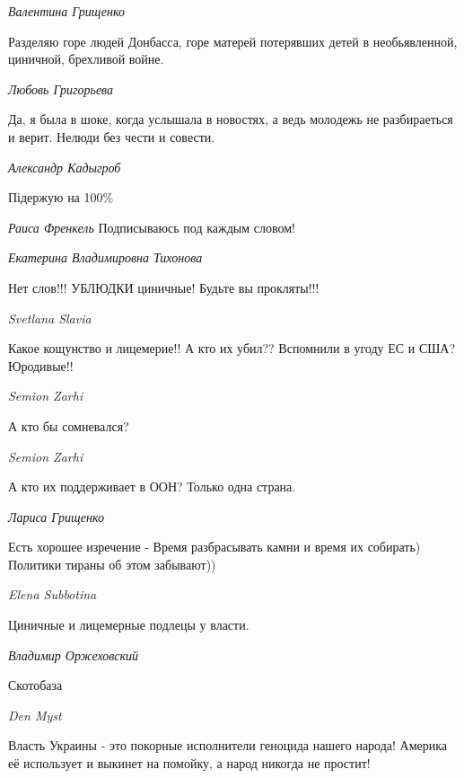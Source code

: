 \emph{Валентина Грищенко}

Разделяю горе людей Донбасса, горе матерей потерявших детей в необьявленной,
циничной, брехливой войне.

\emph{Любовь Григорьева}

Да, я была в шоке, когда услышала в новостях, а ведь молодежь не разбираеться и верит. Нелюди без чести и совести.

\emph{Александр Кадыгроб}

Підержую на 100\%

\emph{Раиса Френкель}
Подписываюсь под каждым словом!

\emph{Екатерина Владимировна Тихонова}

Нет слов!!! УБЛЮДКИ циничные! Будьте вы прокляты!!!

\emph{Svetlana Slavia}

Какое кощунство и лицемерие!! А кто их убил?? Вспомнили в угоду ЕС и США? Юродивые!!

\emph{Semion Zarhi}

А кто бы сомневался?

\emph{Semion Zarhi}

А кто их поддерживает в ООН? Только одна страна.

\emph{Лариса Грищенко}

Есть хорошее изречение - Время разбрасывать камни и время их собирать) Политики тираны об этом забывают))

\emph{Elena Subbotina}

Циничные и лицемерные подлецы у власти. 🙁

\emph{Владимир Оржеховский}

Скотобаза

\emph{Den Myst}

Власть Украины - это покорные исполнители геноцида нашего народа! Америка её
использует и выкинет на помойку, а народ никогда не простит!
